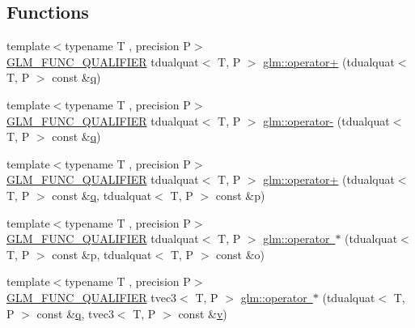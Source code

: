 \subsection*{Functions}
\begin{DoxyCompactItemize}
\item 
{\footnotesize template$<$typename T , precision P$>$ }\\\mbox{\hyperlink{setup_8hpp_a33fdea6f91c5f834105f7415e2a64407}{G\+L\+M\+\_\+\+F\+U\+N\+C\+\_\+\+Q\+U\+A\+L\+I\+F\+I\+ER}} tdualquat$<$ T, P $>$ \mbox{\hyperlink{group__gtx__dual__quaternion_gaf14cf93205560472618c9f93a52a2e1f}{glm\+::operator+}} (tdualquat$<$ T, P $>$ const \&\mbox{\hyperlink{glad_8h_a514729309336df22bcc8eda979d6ced4}{q}})
\item 
{\footnotesize template$<$typename T , precision P$>$ }\\\mbox{\hyperlink{setup_8hpp_a33fdea6f91c5f834105f7415e2a64407}{G\+L\+M\+\_\+\+F\+U\+N\+C\+\_\+\+Q\+U\+A\+L\+I\+F\+I\+ER}} tdualquat$<$ T, P $>$ \mbox{\hyperlink{group__gtx__dual__quaternion_ga90a25279ac4f392a823e8bf6dfaddb9b}{glm\+::operator-\/}} (tdualquat$<$ T, P $>$ const \&\mbox{\hyperlink{glad_8h_a514729309336df22bcc8eda979d6ced4}{q}})
\item 
{\footnotesize template$<$typename T , precision P$>$ }\\\mbox{\hyperlink{setup_8hpp_a33fdea6f91c5f834105f7415e2a64407}{G\+L\+M\+\_\+\+F\+U\+N\+C\+\_\+\+Q\+U\+A\+L\+I\+F\+I\+ER}} tdualquat$<$ T, P $>$ \mbox{\hyperlink{group__gtx__dual__quaternion_ga9d7cfca38c6ff90757705600da3c7972}{glm\+::operator+}} (tdualquat$<$ T, P $>$ const \&\mbox{\hyperlink{glad_8h_a514729309336df22bcc8eda979d6ced4}{q}}, tdualquat$<$ T, P $>$ const \&p)
\item 
{\footnotesize template$<$typename T , precision P$>$ }\\\mbox{\hyperlink{setup_8hpp_a33fdea6f91c5f834105f7415e2a64407}{G\+L\+M\+\_\+\+F\+U\+N\+C\+\_\+\+Q\+U\+A\+L\+I\+F\+I\+ER}} tdualquat$<$ T, P $>$ \mbox{\hyperlink{group__gtx__dual__quaternion_gacb43d8513f47848a1e228f7cfa47b4a8}{glm\+::operator $\ast$}} (tdualquat$<$ T, P $>$ const \&p, tdualquat$<$ T, P $>$ const \&o)
\item 
{\footnotesize template$<$typename T , precision P$>$ }\\\mbox{\hyperlink{setup_8hpp_a33fdea6f91c5f834105f7415e2a64407}{G\+L\+M\+\_\+\+F\+U\+N\+C\+\_\+\+Q\+U\+A\+L\+I\+F\+I\+ER}} tvec3$<$ T, P $>$ \mbox{\hyperlink{group__gtx__dual__quaternion_gaf6c5a7a17854cbb1c8e6e34cc494f7af}{glm\+::operator $\ast$}} (tdualquat$<$ T, P $>$ const \&\mbox{\hyperlink{glad_8h_a514729309336df22bcc8eda979d6ced4}{q}}, tvec3$<$ T, P $>$ const \&\mbox{\hyperlink{glad_8h_a14cfbe2fc2234f5504618905b69d1e06}{v}})

\end{DoxyCompactItemize}
